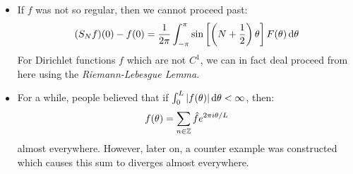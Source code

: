 \documentclass[../main.tex]{subfiles}
\begin{document}
\begin{remark}[Remarks]
  \nonexaminable
  \begin{itemize}
    \item If $f$ was not so regular, then we cannot proceed past:
      \[
        (S_N f)(0) - f(0) = \frac{1}{2\pi} \int_{-\pi}^{\pi} \sin\left[\left(N + \frac{1}{2}\right)\theta\right] F(\theta) \d{\theta}
      \]
      For Dirichlet functions $f$ which are not $C^{1}$, we can in fact deal proceed from here using the \textit{Riemann-Lebesgue Lemma}.
    \item For a while, people believed that if $\int_{0}^{L} |f(\theta)| \d{\theta} < \infty$, then:
      \[
        f(\theta) = \sum_{n \in \mathbb{Z}} \hat{f} e^{2 \pi i \theta / L}
      \]
      almost everywhere.
      However, later on, a counter example was constructed which causes this sum to diverges almost everywhere.
  \end{itemize}
\end{remark}
\end{document}
